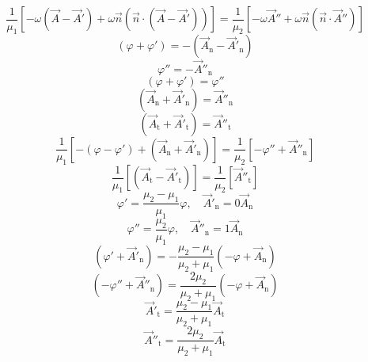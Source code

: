 \begin{equation}
    \frac{1}{\mu_1}[-\omega(\vec{A}-\vec{A}')+\omega\vec{n}(\vec{n}\cdot(\vec{A}-\vec{A}'))]=\frac{1}{\mu_2}[-\omega\vec{A}''+\omega\vec{n}(\vec{n}\cdot\vec{A}'')]
\end{equation}
\begin{equation}
    (\varphi+\varphi')=-(\vec{A}_\text{n}-\vec{A}'_\text{n})
\end{equation}
\begin{equation}
    \varphi''=-\vec{A}''_\text{n}
\end{equation}
\begin{equation}
    (\varphi+\varphi')=\varphi''
\end{equation}
\begin{equation}
    (\vec{A}_\text{n}+\vec{A}'_\text{n})=\vec{A}''_\text{n}
\end{equation}
\begin{equation}
    (\vec{A}_\text{t}+\vec{A}'_\text{t})=\vec{A}''_\text{t}
\end{equation}
\begin{equation}
    \frac{1}{\mu_1}[-(\varphi-\varphi')+(\vec{A}_\text{n}+\vec{A}'_\text{n})]=\frac{1}{\mu_2}[-\varphi''+\vec{A}''_\text{n}]
\end{equation}
\begin{equation}
    \frac{1}{\mu_1}[(\vec{A}_\text{t}-\vec{A}'_\text{t})]=\frac{1}{\mu_2}[\vec{A}''_\text{t}]
\end{equation}
\begin{equation}
    \varphi'=\frac{\mu_2-\mu_1}{\mu_1}\varphi,\quad\vec{A}'_\text{n}=0\vec{A}_\text{n}
\end{equation}
\begin{equation}
    \varphi''=\frac{\mu_2}{\mu_1}\varphi,\quad\vec{A}''_\text{n}=1\vec{A}_\text{n}
\end{equation}
\begin{equation}
    (\varphi'+\vec{A}'_\text{n})=-\frac{\mu_2-\mu_1}{\mu_2+\mu_1}(-\varphi+\vec{A}_\text{n})
\end{equation}
\begin{equation}
    (-\varphi''+\vec{A}''_\text{n})=\frac{2\mu_2}{\mu_2+\mu_1}(-\varphi+\vec{A}_\text{n})
\end{equation}
\begin{equation}
    \vec{A}'_\text{t}=\frac{\mu_2-\mu_1}{\mu_2+\mu_1}\vec{A}_\text{t}
\end{equation}
\begin{equation}
    \vec{A}''_\text{t}=\frac{2\mu_2}{\mu_2+\mu_1}\vec{A}_\text{t}
\end{equation}
